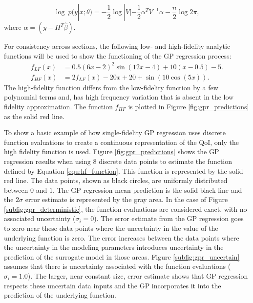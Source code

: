 \begin{equation}
    \log~p(y|x;\theta) = -\frac{1}{2} \log|V| - \frac{1}{2}\alpha^T V^{-1}\alpha - \frac{n}{2}\log 2\pi,
\end{equation}
where $\alpha = \left ( y-H^T\hat{\beta} \right )$.

For consistency across sections, the following low- and high-fidelity analytic functions will be used to show the functioning of the GP regression process: 
\begin{align} \label{equ:lf_function}
    f_{LF}(x) &= 0.5 \left ( 6x - 2\right )^2 \sin{ \left (12x -4 \right )} + 10 \left ( x - 0.5 \right ) -5.
\\ \label{equ:hf_function}
    f_{HF}(x) &= 2 f_{LF}(x) - 20x + 20 + \sin {\left ( 10 \cos{ \left ( 5x \right )}\right )}.
\end{align}
The high-fidelity function differs from the low-fidelity function by a few polynomial terms and, has high frequency variation that is absent in the low fidelity approximation. 
The function $f_{HF}$ is plotted in Figure \ref{fig:gpr_predictions} as the solid red line. 

To show a basic example of how single-fidelity GP regression uses discrete function evaluations to create a continuous representation of the QoI, only the high fidelity function is used.
Figure \ref{fig:gpr_predictions} shows the GP regression results when using 8 discrete data points to estimate the function defined by Equation \ref{equ:hf_function}.
This function is represented by the solid red line. 
The data points, shown as black circles, are uniformly distributed between $0$ and $1$.
The GP regression mean prediction is the solid black line and the $2\sigma$ error estimate is represented by the gray area.
In the case of Figure \ref{subfig:gpr_deterministic}, the function evaluations are considered exact, with no associated uncertainty ($\sigma_i = 0$). 
The error estimate from the GP regression goes to zero near these data points where the uncertainty in the value of the underlying function is zero. 
The error increases between the data points where the uncertainty in the modeling parameters introduces uncertainty in the prediction of the surrogate model in those areas. 
Figure \ref{subfig:gpr_uncertain} assumes that there is uncertainty associated with the function evaluations ($\sigma_i = 1.0$).
The larger, near constant size, error estimate shows that GP regression respects these uncertain data inputs and the GP incorporates it into the prediction of the  underlying function.

